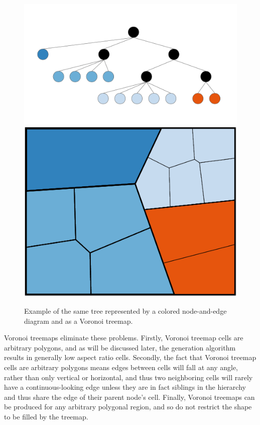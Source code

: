 \documentclass{acm_proc_article-sp} \usepackage{cite}
\begin{document}
\begin{figure}
        \centering
	 \includegraphics[width=\columnwidth]{source-images/simple-tree-colored.png}
	\includegraphics[width=\columnwidth]{source-images/simple-name-3-cropped.PNG}
        \caption{Example of the same tree represented by a colored node-and-edge diagram and as a Voronoi treemap.}
\label{tree:example}
\end{figure}

Voronoi treemaps eliminate these problems. Firstly, Voronoi treemap
cells are arbitrary polygons, and as will be discussed later, the
generation algorithm results in generally low aspect ratio
cells. Secondly, the fact that Voronoi treemap cells are arbitrary
polygons means edges between cells will fall at any angle, rather than
only vertical or horizontal, and thus two neighboring cells will
rarely have a continuous-looking edge unless they are in fact
siblings in the hierarchy and thus share the edge of their parent
node's cell. Finally, Voronoi treemaps can be produced for any
arbitrary polygonal region, and so do not restrict the shape to be
filled by the treemap.
\end{document}
